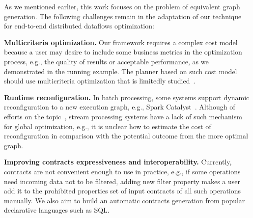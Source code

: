 As we mentioned earlier, this work focuses on the problem of equivalent graph generation. The following challenges remain in the adaptation of our technique for end-to-end distributed dataflows optimization:

\textbf{Multicriteria optimization.}
Our framework requires a complex cost model because a user may desire to include some business metrics in the optimization process, e.g., the quality of results or acceptable performance, as we demonstrated in the running example. The planner based on such cost model should use multicriteria optimization that is limitedly studied~\cite{yarygina2014optimizing}.

\textbf{Runtime reconfiguration.}
In batch processing, some systems support dynamic reconfiguration to a new execution graph, e.g., Spark Catalyst~\cite{armbrust2015spark}. Although of efforts on the topic~\cite{grulich2020grizzly}, stream processing systems have a lack of such mechanism for global optimization, e.g., it is unclear how to estimate the cost of reconfiguration in comparison with the potential outcome from the more optimal graph.

\textbf{Improving contracts expressiveness and interoperability.}
Currently, contracts are not convenient enough to use in practice, e.g., if some operations need incoming data not to be filtered, adding new filter property makes a user add it to the prohibited properties set of input contracts of all such operations manually. We also aim to build an automatic contracts generation from popular declarative languages such as SQL.
